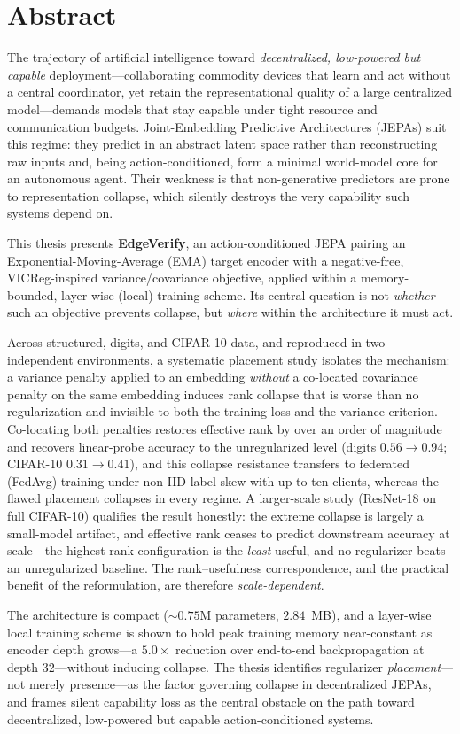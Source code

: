 \chapter*{Abstract}

The trajectory of artificial intelligence toward \emph{decentralized,
low-powered but capable} deployment---collaborating commodity devices that
learn and act without a central coordinator, yet retain the representational
quality of a large centralized model---demands models that stay capable under
tight resource and communication budgets. Joint-Embedding Predictive
Architectures (JEPAs) suit this regime: they predict in an abstract latent
space rather than reconstructing raw inputs and, being action-conditioned,
form a minimal world-model core for an autonomous agent. Their weakness is
that non-generative predictors are prone to representation collapse, which
silently destroys the very capability such systems depend on.

This thesis presents \textbf{EdgeVerify}, an action-conditioned JEPA pairing
an Exponential-Moving-Average (EMA) target encoder with a negative-free,
VICReg-inspired variance/covariance objective, applied within a
memory-bounded, layer-wise (local) training scheme. Its central question is
not \emph{whether} such an objective prevents collapse, but \emph{where}
within the architecture it must act.

Across structured, digits, and CIFAR-10 data, and reproduced in two
independent environments, a systematic placement study isolates the mechanism:
a variance penalty applied to an embedding \emph{without} a co-located
covariance penalty on the same embedding induces rank collapse that is worse
than no regularization and invisible to both the training loss and the
variance criterion. Co-locating both penalties restores effective rank by over
an order of magnitude and recovers linear-probe accuracy to the unregularized
level (digits $0.56\!\rightarrow\!0.94$; CIFAR-10 $0.31\!\rightarrow\!0.41$),
and this collapse resistance transfers to federated (FedAvg) training under
non-IID label skew with up to ten clients, whereas the flawed placement
collapses in every regime. A larger-scale study (ResNet-18 on full CIFAR-10)
qualifies the result honestly: the extreme collapse is largely a small-model
artifact, and effective rank ceases to predict downstream accuracy at
scale---the highest-rank configuration is the \emph{least} useful, and no
regularizer beats an unregularized baseline. The rank--usefulness
correspondence, and the practical benefit of the reformulation, are therefore
\emph{scale-dependent}.

The architecture is compact ($\sim\!0.75$M parameters, $2.84$~MB), and a
layer-wise local training scheme is shown to hold peak training memory
near-constant as encoder depth grows---a $5.0\times$ reduction over end-to-end
backpropagation at depth $32$---without inducing collapse. The thesis
identifies regularizer \emph{placement}---not merely presence---as the factor
governing collapse in decentralized JEPAs, and frames silent capability loss
as the central obstacle on the path toward decentralized, low-powered but
capable action-conditioned systems.
